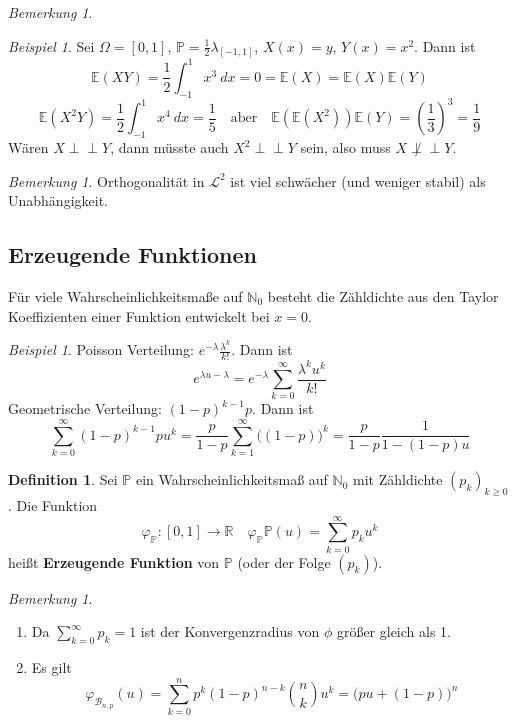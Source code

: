 \documentclass[10pt,a4paper]{article}
\newcommand{\N}{\ensuremath{\mathbb{N}}}
\newcommand{\R}{\ensuremath{\mathbb{R}}}
\newcommand{\la}{\ensuremath{\lambda}}
\newcommand{\indep}{\perp\!\!\!\perp}
\newcommand{\Prb}{\mathbb P}
\newcommand{\Epv}{\ensuremath{\mathbb{E}}}
\newcommand{\scB}{\mathscr B}
\newcommand{\scL}{\mathscr L}
\theoremstyle{plain}
\theoremstyle{definition}
\newtheorem{definition}[theorem]{Definition}
\theoremstyle{remark}
\newtheorem{bem}[theorem]{Bemerkung}
\newtheorem*{bem*}{Bemerkung}
\newtheorem{exm}[theorem]{Beispiel}
\newtheorem*{exm*}{Beispiel}
\begin{document}
	\begin{bem}
	\end{bem}

	\begin{exm*}
		Sei $\Omega=[0,1]$, $\Prb=\frac{1}{2}\lambda_{[-1,1]}$, $X(x)=y$, $Y(x)=x^2$. Dann ist
		\[\Epv(XY)=\frac{1}{2}\int_{-1}^{1}x^3~dx=0=\Epv(X)=\Epv(X)\Epv(Y)\]
		\[\Epv(X^2Y)=\frac{1}{2}\int_{-1}^{1}x^4~dx=\frac{1}{5}\quad\text{aber}\quad\Epv(\Epv(X^2))\Epv(Y)=\left(\frac{1}{3}\right)^3=\frac{1}{9}\]
		Wären $X\indep Y$, dann müsste auch $X^2\indep Y$ sein, also muss $X\not\indep Y$.
	\end{exm*}
	\begin{bem*}
		Orthogonalität in $\scL^2$ ist viel schwächer (und weniger stabil) als Unabhängigkeit.
	\end{bem*}
	
	
	\subsection{Erzeugende Funktionen}
	Für viele Wahrscheinlichkeitsmaße auf $\N_0$ besteht die Zähldichte aus den Taylor Koeffizienten einer Funktion entwickelt bei $x=0$.
	\begin{exm}
		Poisson Verteilung: $e^{-\la}\frac{\la^k}{k!}$. Dann ist
		\[e^{\la u-\la}=e^{-\la}\sum_{k=0}^{\infty}\frac{\la^ku^k}{k!}\]
		Geometrische Verteilung: $(1-p)^{k-1}p$. Dann ist
		\[\sum_{k=0}^{\infty}(1-p)^{k-1}pu^k=\frac{p}{1-p}\sum_{k=1}^{\infty}\big((1-p)\big)^k=\frac{p}{1-p}\frac{1}{1-(1-p)u}\]
	\end{exm}

	\begin{definition}
		Sei $\Prb$ ein Wahrscheinlichkeitsmaß auf $\N_0$ mit Zähldichte $(p_k)_{k\geq 0}$. Die Funktion
		\[\varphi_{\Prb}:[0,1]\to\R\quad \varphi_{\Prb}\Prb(u)=\sum_{k=0}^{\infty}p_ku^k\]
		heißt \textbf{Erzeugende Funktion} von $\Prb$ (oder der Folge $(p_k)$).
	\end{definition}

	\begin{bem}
		\begin{enumerate}
			\item Da $\sum_{k=0}^{\infty}p_k=1$ ist der Konvergenzradius von $\phi$ größer gleich als 1.
			\item Es gilt 
			\[\varphi_{\scB_{n,p}}(u)=\sum_{k=0}^{n}p^k(1-p)^{n-k}\binom{n}{k}u^k=\big(pu+(1-p)\big)^n\]
		\end{enumerate}
	\end{bem}
\end{document}
